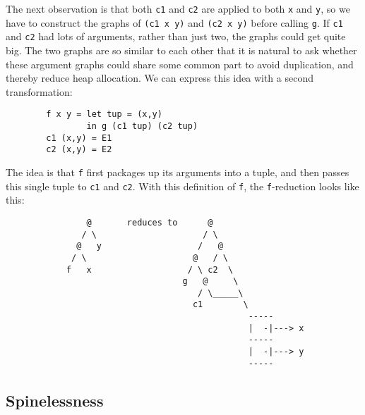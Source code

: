 The next observation is that both \mbox{\tt c1} and \mbox{\tt c2} are applied to both \mbox{\tt x} and
\mbox{\tt y}, so we have to construct the graphs of \mbox{\tt (c1\ x\ y)} and \mbox{\tt (c2\ x\ y)} before
calling \mbox{\tt g}.  If \mbox{\tt c1} and \mbox{\tt c2} had lots of arguments, rather than just two,
the graphs could get quite big.
The two graphs are so similar to each other that
it is natural to ask whether these argument graphs
could share some common part to avoid
duplication, and thereby reduce heap allocation.
We can express this idea with a
second transformation:
\begin{verbatim}
        f x y = let tup = (x,y)
                in g (c1 tup) (c2 tup)
        c1 (x,y) = E1
        c2 (x,y) = E2
\end{verbatim}
The idea is that \mbox{\tt f} first packages up its arguments into a tuple, and
then passes this single tuple to \mbox{\tt c1} and \mbox{\tt c2}.
With this definition of \mbox{\tt f}, the \mbox{\tt f}-reduction looks like this:
\begin{verbatim}
                @       reduces to      @
               / \                     / \
              @   y                   /   @
             / \                     @   / \
            f   x                   / \ c2  \
                                   g   @     \
                                      / \_____\
                                     c1        \
                                                -----
                                                |  -|---> x
                                                -----
                                                |  -|---> y
                                                -----
\end{verbatim}

\subsection{Spinelessness\index{spinelessness}}

